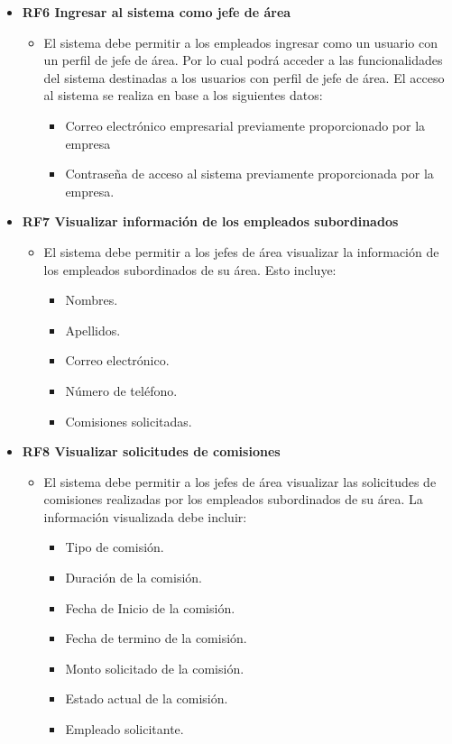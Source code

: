 \begin{itemize}
	\item \textbf{RF6 Ingresar al sistema como jefe de área}
	\begin{itemize}
		\item El sistema debe permitir a los empleados ingresar como un usuario con un perfil de jefe de área. Por lo cual podrá acceder a las funcionalidades del sistema destinadas a los usuarios con perfil de jefe de área. El acceso al sistema se realiza en base a los siguientes datos:
		\begin{itemize}
			\item Correo electrónico empresarial previamente proporcionado por la empresa
			\item Contraseña de acceso al sistema previamente proporcionada por la empresa.
		\end{itemize}
	\end{itemize}

	\item \textbf{RF7 Visualizar información de los empleados subordinados}
	\begin{itemize}
		\item El sistema debe permitir a los jefes de área visualizar la información de los empleados subordinados de su área. Esto incluye:
		\begin{itemize}
			\item Nombres.
			\item Apellidos.
			\item Correo electrónico.
			\item Número de teléfono.
			\item Comisiones solicitadas.
		\end{itemize}
	\end{itemize}

	\item \textbf{RF8 Visualizar solicitudes de comisiones}
	\begin{itemize}
		\item El sistema debe permitir a los jefes de área visualizar las solicitudes de comisiones realizadas por los empleados subordinados de su área. La información visualizada debe incluir:
		\begin{itemize}
			\item Tipo de comisión.
			\item Duración de la comisión.
			\item Fecha de Inicio de la comisión.
			\item Fecha de termino de la comisión.
			\item Monto solicitado de la comisión.
			\item Estado actual de la comisión.
			\item Empleado solicitante.
		\end{itemize}
	\end{itemize}


\end{itemize}

